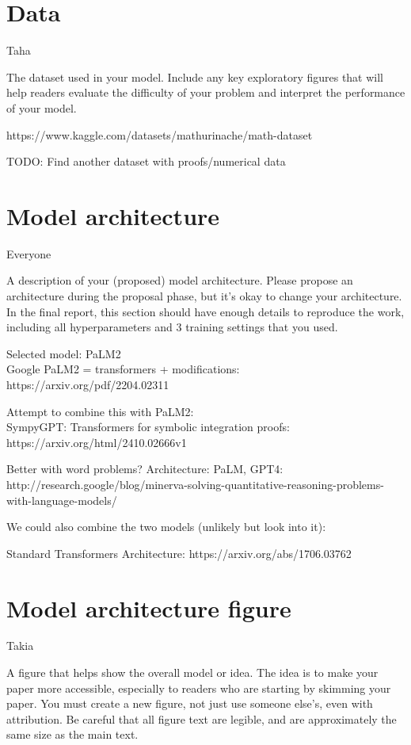 \documentclass{article}
\begin{document}
\section{Data}
Taha 

The dataset used in your model. Include any key
exploratory figures that will help readers evaluate the
difficulty of your problem and interpret the performance
of your model.

https://www.kaggle.com/datasets/mathurinache/math-dataset

TODO: Find another dataset with proofs/numerical data


\section{Model architecture}
Everyone

A description of your (proposed) model architecture.
Please propose an architecture during the proposal
phase, but it's okay to change your architecture. In the
final report, this section should have enough details to
reproduce the work, including all hyperparameters and 3 training settings that you used.

 
Selected model: PaLM2 \\
Google PaLM2 = transformers + modifications: https://arxiv.org/pdf/2204.02311

Attempt to combine this with PaLM2: \\
SympyGPT: Transformers for symbolic integration proofs: https://arxiv.org/html/2410.02666v1


Better with word problems?
Architecture: PaLM, GPT4: http://research.google/blog/minerva-solving-quantitative-reasoning-problems-with-language-models/

We could also combine the two models (unlikely but look into it):

Standard Transformers Architecture: https://arxiv.org/abs/1706.03762

\section{Model architecture figure}
Takia

A figure that helps show the overall model or idea. The
idea is to make your paper more accessible, especially
to readers who are starting by skimming your paper.
You must create a new figure, not just use someone
else's, even with attribution. Be careful that all figure
text are legible, and are approximately the same size
as the main text.
\end{document}
